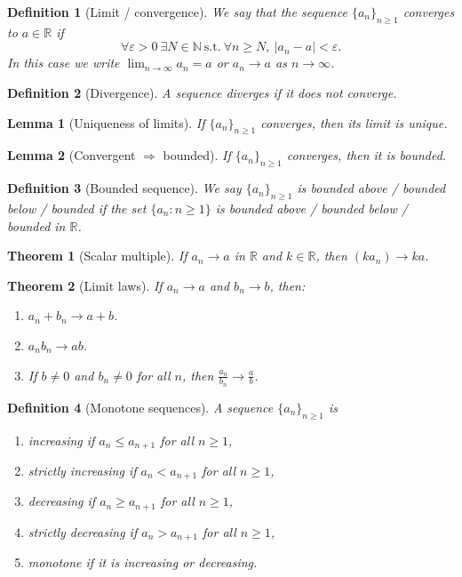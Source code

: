 \documentclass[12pt]{article}
\newtheorem*{lemma}{Lemma}
\newtheorem{theorem}{Theorem}
\newtheorem{definition}{Definition}
\begin{document}
\begin{definition}[Limit / convergence]
We say that the sequence $\{a_n\}_{n\ge 1}$ \emph{converges} to $a\in\mathbb{R}$ if
\[
\forall\varepsilon>0\ \exists N\in\mathbb{N}\ \text{s.t.}\ \forall n\ge N,\ |a_n-a|<\varepsilon.
\]
In this case we write $\lim_{n\to\infty} a_n=a$ or $a_n\to a$ as $n\to\infty$.
\end{definition}

\begin{definition}[Divergence]
A sequence \emph{diverges} if it does not converge.
\end{definition}

\begin{lemma}[Uniqueness of limits]
If $\{a_n\}_{n\ge1}$ converges, then its limit is unique.
\end{lemma}

\begin{lemma}[Convergent $\Rightarrow$ bounded]
If $\{a_n\}_{n\ge1}$ converges, then it is bounded.
\end{lemma}

\begin{definition}[Bounded sequence]
We say $\{a_n\}_{n\ge1}$ is bounded above / bounded below / bounded if the set $\{a_n:n\ge1\}$ is bounded above / bounded below / bounded in $\mathbb{R}$.
\end{definition}

\begin{theorem}[Scalar multiple]
If $a_n\to a$ in $\mathbb{R}$ and $k\in\mathbb{R}$, then $(ka_n)\to ka$.
\end{theorem}

\begin{theorem}[Limit laws]
If $a_n\to a$ and $b_n\to b$, then:
\begin{enumerate}
\item $a_n+b_n\to a+b$.
\item $a_n b_n\to ab$.
\item If $b\ne 0$ and $b_n\ne 0$ for all $n$, then $\displaystyle \frac{a_n}{b_n}\to \frac{a}{b}$.
\end{enumerate}
\end{theorem}

\begin{definition}[Monotone sequences]
A sequence $\{a_n\}_{n\ge1}$ is
\begin{enumerate}
\item \emph{increasing} if $a_n\le a_{n+1}$ for all $n\ge1$,
\item \emph{strictly increasing} if $a_n<a_{n+1}$ for all $n\ge1$,
\item \emph{decreasing} if $a_n\ge a_{n+1}$ for all $n\ge1$,
\item \emph{strictly decreasing} if $a_n>a_{n+1}$ for all $n\ge1$,
\item \emph{monotone} if it is increasing or decreasing.
\end{enumerate}
\end{definition}
\end{document}
